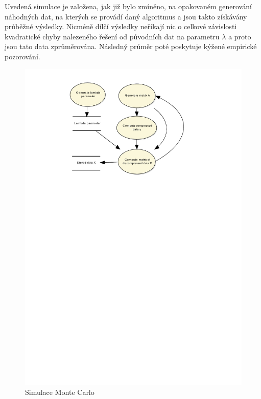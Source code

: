 \documentclass[FM,BP]{tulthesis}
\begin{document}
Uvedená simulace je založena, jak již bylo zmíněno, na opakovaném generování náhodných dat, na kterých se provádí daný algoritmus a jsou takto získávány průběžné výsledky. Nicméně dílčí výsledky neříkají nic o celkové závislosti kvadratické chyby nalezeného řešení od původních dat na parametru $\lambda$ a proto jsou tato data zprůměrována. Následný průměr poté poskytuje kýžené empirické pozorování. 

\begin{figure}[!ht]
	\begin{center}
		\includegraphics[scale=0.9]{obr/mcsim.pdf}
	\end{center}
	\caption{Simulace Monte Carlo}
	\label{fig:mcSim}
\end{figure}
\end{document}
